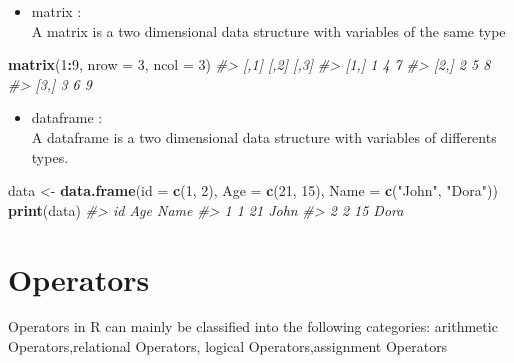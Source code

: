 \documentclass[
]{book}
\newenvironment{Shaded}{\begin{snugshade}}{\end{snugshade}}
\newcommand{\AttributeTok}[1]{\textcolor[rgb]{0.13,0.29,0.53}{#1}}
\newcommand{\CommentTok}[1]{\textcolor[rgb]{0.56,0.35,0.01}{\textit{#1}}}
\newcommand{\DecValTok}[1]{\textcolor[rgb]{0.00,0.00,0.81}{#1}}
\newcommand{\FunctionTok}[1]{\textcolor[rgb]{0.13,0.29,0.53}{\textbf{#1}}}
\newcommand{\NormalTok}[1]{#1}
\newcommand{\OtherTok}[1]{\textcolor[rgb]{0.56,0.35,0.01}{#1}}
\newcommand{\SpecialCharTok}[1]{\textcolor[rgb]{0.81,0.36,0.00}{\textbf{#1}}}
\newcommand{\StringTok}[1]{\textcolor[rgb]{0.31,0.60,0.02}{#1}}
\providecommand{\tightlist}{%
  \setlength{\itemsep}{0pt}\setlength{\parskip}{0pt}}
\begin{document}
\begin{itemize}
\tightlist
\item
  matrix :\\
  A matrix is a two dimensional data structure with variables of the same type
\end{itemize}

\begin{Shaded}
\begin{Highlighting}[]
\FunctionTok{matrix}\NormalTok{(}\DecValTok{1}\SpecialCharTok{:}\DecValTok{9}\NormalTok{, }\AttributeTok{nrow =} \DecValTok{3}\NormalTok{, }\AttributeTok{ncol =} \DecValTok{3}\NormalTok{)}
\CommentTok{\#\textgreater{}      [,1] [,2] [,3]}
\CommentTok{\#\textgreater{} [1,]    1    4    7}
\CommentTok{\#\textgreater{} [2,]    2    5    8}
\CommentTok{\#\textgreater{} [3,]    3    6    9}
\end{Highlighting}
\end{Shaded}

\begin{itemize}
\tightlist
\item
  dataframe :\\
  A dataframe is a two dimensional data structure with variables of differents types.
\end{itemize}

\begin{Shaded}
\begin{Highlighting}[]
\NormalTok{data }\OtherTok{\textless{}{-}} \FunctionTok{data.frame}\NormalTok{(}\AttributeTok{id =} \FunctionTok{c}\NormalTok{(}\DecValTok{1}\NormalTok{, }\DecValTok{2}\NormalTok{), }\AttributeTok{Age =} \FunctionTok{c}\NormalTok{(}\DecValTok{21}\NormalTok{, }\DecValTok{15}\NormalTok{), }\AttributeTok{Name =} \FunctionTok{c}\NormalTok{(}\StringTok{"John"}\NormalTok{, }\StringTok{"Dora"}\NormalTok{))}
\FunctionTok{print}\NormalTok{(data)}
\CommentTok{\#\textgreater{}   id Age Name}
\CommentTok{\#\textgreater{} 1  1  21 John}
\CommentTok{\#\textgreater{} 2  2  15 Dora}
\end{Highlighting}
\end{Shaded}

\hypertarget{operators}{%
\section{Operators}\label{operators}}

Operators in R can mainly be classified into the following categories: arithmetic Operators,relational Operators, logical Operators,assignment Operators
\end{document}

